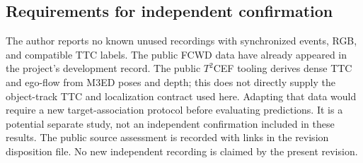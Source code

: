 \subsection{Requirements for independent confirmation}
The author reports no known unused recordings with synchronized events, RGB, and compatible TTC labels. The public FCWD data have already appeared in the project's development record. The public $T^2$CEF tooling derives dense TTC and ego-flow from M3ED poses and depth; this does not directly supply the object-track TTC and localization contract used here. Adapting that data would require a new target-association protocol before evaluating predictions. It is a potential separate study, not an independent confirmation included in these results. The public source assessment is recorded with links in the revision disposition file. No new independent recording is claimed by the present revision.
